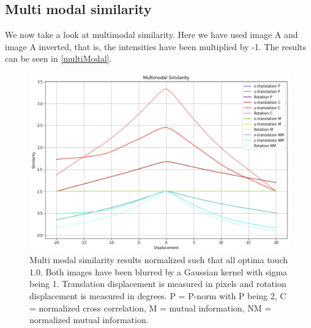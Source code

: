 \subsection{Multi modal similarity}
We now take a look at multimodal similarity. Here we have used image A and image A inverted, that is, the intensities have been multiplied by -1. The results can be seen in \autoref{multiModal}.

\begin{figure}
	\centering
	\includegraphics[width=0.8\linewidth]{Materials/multiModalSimilarity}
	\caption{Multi modal similarity results normalized such that all optima touch 1.0. Both images have been blurred by a Gaussian kernel with sigma being 1. Translation displacement is measured in pixels and rotation displacement is measured in degrees. P = P-norm with P being 2, C = normalized cross correlation, M = mutual information, NM = normalized mutual information.}
	\label{multiModal}
\end{figure}

